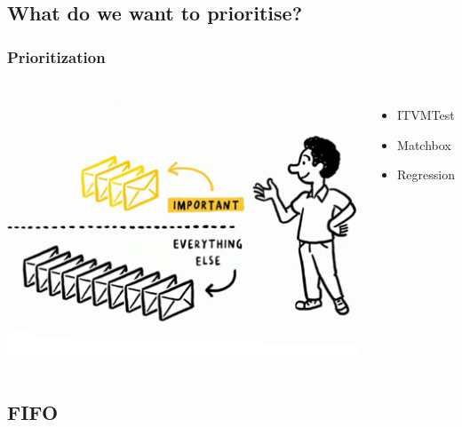 \documentclass[xcolor=pdftex,dvipsnames,table]{beamer}
\begin{document}
\subsection{What do we want to prioritise?}
\begin{frame}
\frametitle{Prioritization}
\begin{columns}[cc]
\column{1.5in}
\includegraphics[scale=0.33]{priority.jpg}

\column{1.5in}
\begin{itemize}
  \item ITVMTest
  \item Matchbox
  \item Regression
\end{itemize}
\end{columns}
\end{frame}

\subsection{FIFO}
\end{document}
